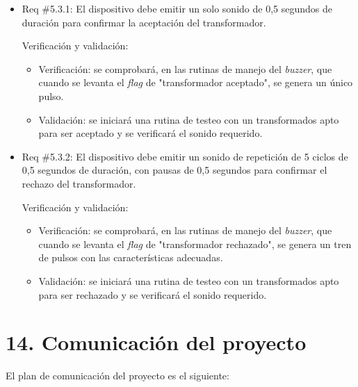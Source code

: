 \documentclass[11pt]{charter}
\begin{document}
\begin{itemize} 
\item Req \#5.3.1: El dispositivo debe emitir un solo sonido de 0,5 segundos de duración para confirmar la aceptación del transformador.

Verificación y validación:

\begin{itemize}
\item Verificación: se comprobará, en las rutinas de manejo del \textit{buzzer}, que cuando se levanta el \textit{flag} de "transformador aceptado", se genera un único pulso.
\item Validación: se iniciará una rutina de testeo con un transformados apto para ser aceptado y se verificará el sonido requerido.  
\end{itemize}

\end{itemize}

\begin{itemize} 
\item Req \#5.3.2: El dispositivo debe emitir un sonido de repetición de 5 ciclos de 0,5 segundos de duración, con pausas de 0,5 segundos para confirmar el rechazo del transformador.

Verificación y validación:

\begin{itemize}
\item Verificación: se comprobará, en las rutinas de manejo del \textit{buzzer}, que cuando se levanta el \textit{flag} de "transformador rechazado", se genera un tren de pulsos con las características adecuadas. 
\item Validación: se iniciará una rutina de testeo con un transformados apto para ser rechazado y se verificará el sonido requerido.   
\end{itemize}

\end{itemize}


\section{14. Comunicación del proyecto}
\label{sec:comunicaciones}

El plan de comunicación del proyecto es el siguiente:
\end{document}
